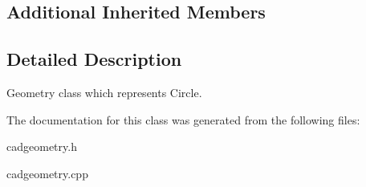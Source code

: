 \subsection*{Additional Inherited Members}


\subsection{Detailed Description}
Geometry class which represents Circle. 

The documentation for this class was generated from the following files\+:\begin{DoxyCompactItemize}
\item 
cadgeometry.\+h\item 
cadgeometry.\+cpp\end{DoxyCompactItemize}
